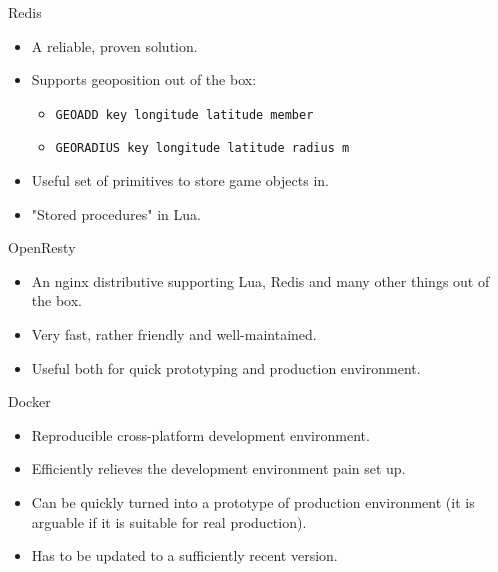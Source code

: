 \documentclass[aspectratio=169,handout,bigger]{beamer}
\begin{document}

\begin{frame}{Redis}
  \begin{itemize}
    \item A reliable, proven solution.
    \item Supports geoposition out of the box:
    \begin{itemize}
      \item \texttt{GEOADD key longitude latitude member}
      \item \texttt{GEORADIUS key longitude latitude radius m}
    \end{itemize}
    \item Useful set of primitives to store game objects in.
    \item "Stored procedures" in Lua.
  \end{itemize}
\end{frame}


\begin{frame}{OpenResty}
  \begin{itemize}
    \item An nginx distributive supporting
          Lua, Redis and many other things out of the box.
    \item Very fast, rather friendly and well-maintained.
    \item Useful both for quick prototyping and production environment.
  \end{itemize}
\end{frame}


\begin{frame}{Docker}
  \begin{itemize}
    \item Reproducible cross-platform development environment.
    \item Efficiently relieves the development environment pain set up.
    \item Can be quickly turned into a prototype of production environment
          (it is arguable if it is suitable for real production).
    \item Has to be updated to a sufficiently recent version.
  \end{itemize}
\end{frame}
\end{document}
